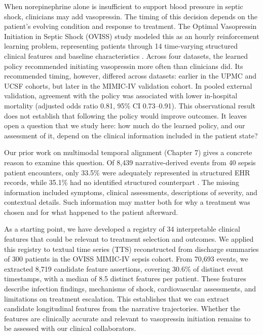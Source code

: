 When norepinephrine alone is insufficient to support blood pressure in septic shock, clinicians may add vasopressin.
The timing of this decision depends on the patient's evolving condition and response to treatment.
The Optimal Vasopressin Initiation in Septic Shock (OVISS) study modeled this as an hourly reinforcement learning problem, representing patients through 14 time-varying structured clinical features and baseline characteristics \citep{kalimouttou2025optimal}.
Across four datasets, the learned policy recommended initiating vasopressin more often than clinicians did.
Its recommended timing, however, differed across datasets: earlier in the UPMC and UCSF cohorts, but later in the MIMIC-IV validation cohort.
In pooled external validation, agreement with the policy was associated with lower in-hospital mortality (adjusted odds ratio 0.81, 95\% CI 0.73--0.91).
This observational result does not establish that following the policy would improve outcomes.
It leaves open a question that we study here: how much do the learned policy, and our assessment of it, depend on the clinical information included in the patient state?

Our prior work on multimodal temporal alignment (Chapter 7) gives a concrete reason to examine this question.
Of 8,439 narrative-derived events from 40 sepsis patient encounters, only 33.5\% were adequately represented in structured EHR records, while 35.1\% had no identified structured counterpart \citep{kumar2026text}.
The missing information included symptoms, clinical assessments, descriptions of severity, and contextual details.
Such information may matter both for why a treatment was chosen and for what happened to the patient afterward.

As a starting point, we have developed a registry of 34 interpretable clinical features that could be relevant to treatment selection and outcomes.
We applied this registry to textual time series (TTS) reconstructed from discharge summaries of 300 patients in the OVISS MIMIC-IV sepsis cohort.
From 70,693 events, we extracted 8,719 candidate feature assertions, covering 30.6\% of distinct event timestamps, with a median of 8.5 distinct features per patient.
These features describe infection findings, mechanisms of shock, cardiovascular assessments, and limitations on treatment escalation.
This establishes that we can extract candidate longitudinal features from the narrative trajectories.
Whether the features are clinically accurate and relevant to vasopressin initiation remains to be assessed with our clinical collaborators.

